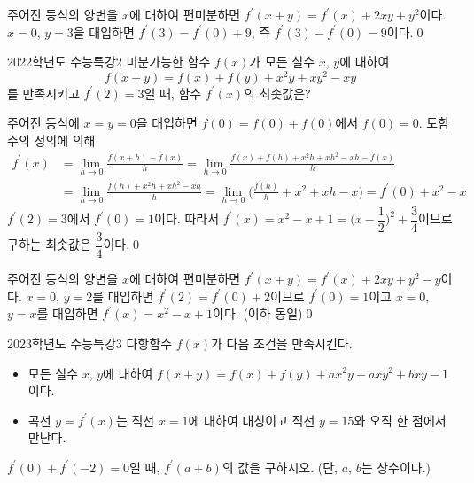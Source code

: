 \documentclass{article}
\begin{document}
\begin{sol}[편미분 풀이]
	주어진 등식의 양변을 $x$에 대하여 편미분하면 $f^\prime(x+y)=f^\prime(x)+2xy+y^2$이다. $x=0$, $y=3$을 대입하면 $f^\prime(3)=f^\prime(0)+9$, 즉 $f^\prime(3)-f^\prime(0)=9$이다.\qed
\end{sol}

\newpage
\begin{prob}{2022학년도 수능특강}{2}
	미분가능한 함수 $f(x)$가 모든 실수 $x$, $y$에 대하여
	\[
		f(x+y)=f(x)+f(y)+x^2y+xy^2-xy
	\]
	를 만족시키고 $f^\prime(2)=3$일 때, 함수 $f^\prime(x)$의 최솟값은?
\end{prob}

\begin{sol}[정석 풀이]
	주어진 등식에 $x=y=0$을 대입하면 $f(0)=f(0)+f(0)$에서 $f(0)=0$. 도함수의 정의에 의해
	\begin{align*}
		f^\prime(x)&=\lim\limits_{h\to0}\frac{f(x+h)-f(x)}{h}=\lim\limits_{h\to0}\frac{f(x)+f(h)+x^2h+xh^2-xh-f(x)}{h}\\[3pt]
		&=\lim\limits_{h\to0}\frac{f(h)+x^2h+xh^2-xh}{h}=\lim\limits_{h\to0}\biggl(\frac{f(h)}{h}+x^2+xh-x\biggr)=f^\prime(0)+x^2-x
	\end{align*}
	$f^\prime(2)=3$에서 $f^\prime(0)=1$이다. 따라서 $f^\prime(x)=x^2-x+1=\biggl(x-\dfrac{1}{2}\biggr)^2+\dfrac{3}{4}$이므로 구하는 최솟값은 $\dfrac{3}{4}$이다.\qed
\end{sol}

\begin{sol}[편미분 풀이]
	주어진 등식의 양변을 $x$에 대하여 편미분하면 $f^\prime(x+y)=f^\prime(x)+2xy+y^2-y$이다. $x=0$, $y=2$를 대입하면 $f^\prime(2)=f^\prime(0)+2$이므로 $f^\prime(0)=1$이고 $x=0$, $y=x$를 대입하면 $f^\prime(x)=x^2-x+1$이다. (이하 동일)\qed
\end{sol}

\newpage
\begin{prob}{2023학년도 수능특강}{3}
	다항함수 $f(x)$가 다음 조건을 만족시킨다.
	\begin{hint}
		\begin{itemize}
			\item[(가)] 모든 실수 $x$, $y$에 대하여 $f(x+y)=f(x)+f(y)+ax^2y+axy^2+bxy-1$이다.
			\item[(나)] 곡선 $y=f^\prime(x)$는 직선 $x=1$에 대하여 대칭이고 직선 $y=15$와 오직 한 점에서 만난다.
		\end{itemize}
	\end{hint}
	$f^\prime(0)+f^\prime(-2)=0$일 때, $f^\prime(a+b)$의 값을 구하시오. (단, $a$, $b$는 상수이다.)
\end{prob}
\end{document}
